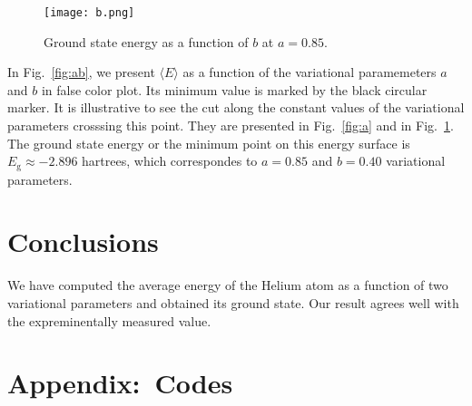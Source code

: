 \documentclass[aps,prb,twocolumn,showpacs,floatfix,superscriptaddress]{revtex4-1}
\begin{document}
\begin{figure}
        \texttt{[image: b.png]}
        \caption{Ground state energy as a function of $b$ at $a = 0.85$.}
        \label{fig:b}
\end{figure}

In Fig.~\ref{fig:ab}, we present $\langle E \rangle$ as a function of the variational paramemeters $a$ and $b$ in false color plot. Its minimum value is marked by the black circular marker. It is illustrative to see the cut along the constant values of the variational parameters crosssing this point. They are presented in Fig.~\ref{fig:a} and in Fig.~\ref{fig:b}. The ground state energy or the minimum point on this energy surface is $E_{\mathrm{g}} \approx -2.896$ hartrees, which correspondes to $a = 0.85$ and $b = 0.40$ variational parameters.  


\section{Conclusions}

We have computed the average energy of the Helium atom as a function of two variational parameters and obtained its ground state. Our result agrees well with the expreminentally measured value.

\section*{Appendix:~Codes}


\end{document}
